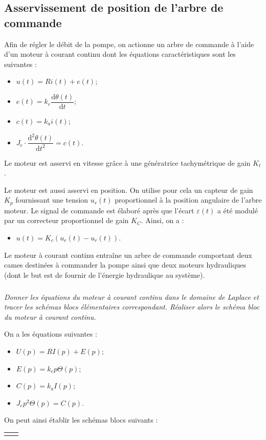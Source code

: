 \documentclass[10pt,fleqn]{article} %
\begin{document}
\begin{multicols}{2}
\subsection*{Asservissement de position de l'arbre de commande}
Afin de régler le débit de la pompe, on actionne un arbre de commande à l'aide d'un moteur à courant continu dont les équations caractéristiques sont les suivantes : 
\begin{itemize}
\item $u(t) = Ri(t)+e(t)$;
\item $e(t)=k_e \dfrac{\text{d}\theta(t)}{\text{d}t}$;
\item $c(t)=k_a i(t)$;
\item $J_e \cdot \dfrac{\text{d}^2\theta(t)}{\text{d}t^2} = c(t)$.
\end{itemize}

Le moteur est asservi en vitesse grâce à une génératrice tachymétrique de gain $K_t$.

Le moteur est aussi asservi en position. On utilise pour cela  un capteur de gain $K_p$ fournissant une tension $u_r(t)$ proportionnel à la position angulaire de l'arbre moteur. Le signal de commande est élaboré après que l'écart $\varepsilon(t)$ a été modulé par un correcteur proportionnel de gain $K_C$. Ainsi, on a :
\begin{itemize}
\item $u(t)=K_c \left(u_e(t)-u_r(t)\right)$.
\end{itemize}

Le moteur à courant continu entraîne un arbre de commande comportant deux cames destinées à commander la pompe ainsi que deux moteurs hydrauliques (dont le but est de fournir de l'énergie hydraulique au système). 


\subparagraph{}
\textit{Donner les équations du moteur à courant continu dans le domaine de Laplace et tracer les schémas blocs élémentaires correspondant. Réaliser alors le schéma bloc du moteur à courant continu.}
\begin{corrige}
On a les équations suivantes : 
\begin{itemize}
\item $U(p) = RI(p)+E(p)$;
\item $E(p)=k_e p\Theta(p)$;
\item $C(p)=k_a I(p)$;
\item $J_e p^2\Theta(p) = C(p)$.
\end{itemize}
On peut ainsi établir les schémas blocs suivants :


\noindent \footnotesize{
\begin{tabular}{cc}
\begin{tikzpicture}
\sbEntree{E}


\end{tikzpicture}
\end{tabular}}
\end{corrige}
\end{multicols}
\end{document}
